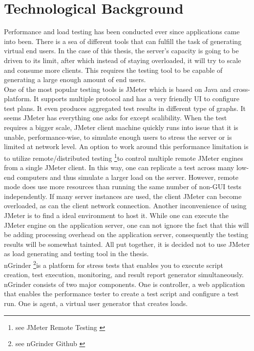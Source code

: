 
\chapter{Technological Background}
\label{technological background}
Performance and load testing has been conducted ever since applications came into been. There is a sea of different tools that can fulfill the task of generating virtual end users. In the case of this thesis, the server's capacity is going to be driven to its limit, after which instead of staying overloaded, it will try to scale and consume more clients. This requires the testing tool to be capable of generating a large enough amount of end users. \\
One of the most popular testing tools is JMeter which is based on Java and cross-platform. It supports multiple protocol and has a very friendly UI to configure test plans. It even produces aggregated test results in different type of graphs. It seems JMeter has everything one asks for except scalibility. When the test requires a bigger scale, JMeter client machine quickly runs into issue that it is unable, performance-wise, to simulate enough users to stress the server or is limited at network level. An option to work around this performance limitation is to utilize remote/distributed testing \footnote{see JMeter Remote Testing \citep{JMeterRemote}}to control multiple remote JMeter engines from a single JMeter client. In this way, one can replicate a test across many low-end computers and thus simulate a larger load on the server. However, remote mode does use more resources than running the same number of non-GUI tests independently. If many server instances are used, the client JMeter can become overloaded, as can the client network connection. Another inconvenience of using JMeter is to find a ideal environment to host it. While one can execute the JMeter engine on the application server, one can not ignore the fact that this will be adding processing overhead on the application server, consequently  the testing results will be somewhat tainted. All put together, it is decided not to use JMeter as load generating and testing tool in the thesis. \\
nGrinder \footnote{see nGrinder Github \citep{NGrinder}}is a platform for stress tests that enables you to execute script creation, test execution, monitoring, and result report generator simultaneously. nGrinder consists of two major components. One is  controller, a web application that enables the performance tester to create a test script and configure a test run. One is agent, a virtual user generator that creates loads. 
